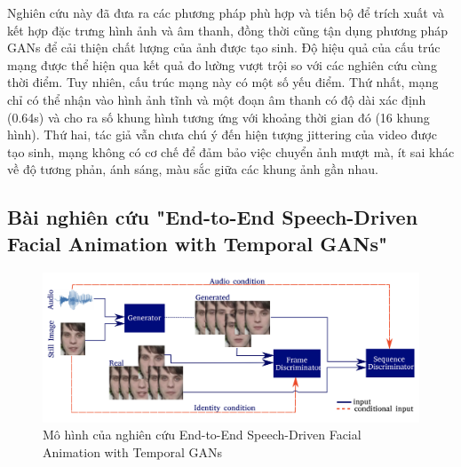 Nghiên cứu này đã đưa ra các phương pháp phù hợp và tiến bộ để trích xuất và kết hợp đặc trưng hình ảnh và âm thanh, đồng thời cũng tận dụng phương pháp GANs để cải thiện chất lượng của ảnh được tạo sinh. Độ hiệu quả của cấu trúc mạng được thể hiện qua kết quả đo lường vượt trội so với các nghiên cứu cùng thời điểm. Tuy nhiên, cấu trúc mạng này có một số yếu điểm. Thứ nhất, mạng chỉ có thể nhận vào hình ảnh tĩnh và một đoạn âm thanh có độ dài xác định (0.64s) và cho ra số khung hình tương ứng với khoảng thời gian đó (16 khung hình). Thứ hai, tác giả vẫn chưa chú ý đến hiện tượng jittering của video được tạo sinh, mạng không có cơ chế để đảm bảo việc chuyển ảnh mượt mà, ít sai khác về độ tương phản, ánh sáng, màu sắc giữa các khung ảnh gần nhau.


\subsection{\texorpdfstring{Bài nghiên cứu "End-to-End Speech-Driven Facial Animation with Temporal GANs"\cite{vougioukas2019}}{Target}}
\label{sec:vougioukas2019}

\begin{figure}[H]
    \centering
    \includegraphics[width=15cm]{./content/images/vou2019_model.png}
    \caption{Mô hình của nghiên cứu End-to-End Speech-Driven Facial Animation with Temporal GANs}
    \label{fig:vou2019_model}
\end{figure}


